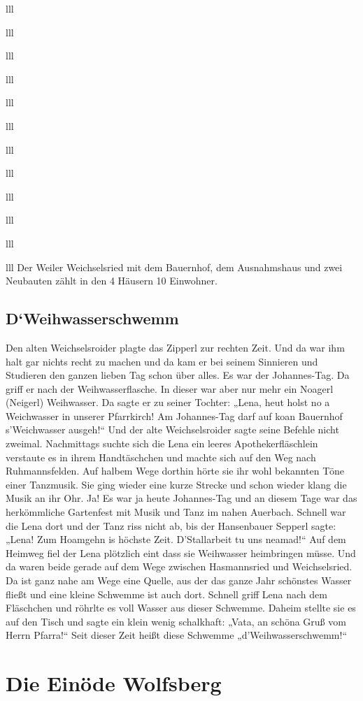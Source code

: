 \documentclass[12pt,a4pager]{book}
\begin{document}
\begin{tabuluar}{lll}
\begin{tabuluar}{lll}
\begin{tabuluar}{lll}
\begin{tabuluar}{lll}
\begin{tabuluar}{lll}
\begin{tabuluar}{lll}
\begin{tabuluar}{lll}
\begin{tabuluar}{lll}
\begin{tabuluar}{lll}
\begin{tabuluar}{lll}
\begin{tabuluar}{lll}
\begin{tabuluar}{lll}
Der Weiler Weichselsried mit dem Bauernhof, dem Ausnahmshaus und zwei Neubauten
zählt in den 4 Häusern 10 Einwohner.

\subsection{D`Weihwasserschwemm}

Den alten Weichselsroider plagte das Zipperl zur rechten Zeit. Und da war ihm
halt gar nichts recht zu machen und da kam er bei seinem Sinnieren und Studieren
den ganzen lieben Tag schon über alles. Es war der Johannes-Tag. Da griff er
nach der Weihwasserflasche. In dieser war aber nur mehr ein Noagerl (Neigerl)
Weihwasser. Da sagte er zu seiner Tochter: „Lena, heut holst no a Weichwasser in
unserer Pfarrkirch! Am Johannes-Tag darf auf koan Bauernhof s'Weichwasser
ausgeh!“ Und der alte Weichselsroider sagte seine Befehle nicht zweimal.
Nachmittags suchte sich die Lena ein leeres Apothekerfläschlein verstaute es in
ihrem Handtäschchen und machte sich auf den Weg nach Ruhmannsfelden. Auf halbem
Wege dorthin hörte sie ihr wohl bekannten Töne einer Tanzmusik. Sie ging wieder
eine kurze Strecke und schon wieder klang die Musik an ihr Ohr. Ja! Es war ja
heute Johannes-Tag und an diesem Tage war das herkömmliche Gartenfest mit Musik
und Tanz im nahen Auerbach. Schnell war die Lena dort und der Tanz riss nicht
ab, bis der Hansenbauer Sepperl sagte: „Lena! Zum Hoamgehn is höchste Zeit.
D'Stallarbeit tu uns neamad!“ Auf dem Heimweg fiel der Lena plötzlich eint dass
sie Weihwasser heimbringen müsse. Und da waren beide gerade auf dem Wege
zwischen Hasmannsried und Weichselsried. Da ist ganz nahe am Wege eine Quelle,
aus der das ganze Jahr schönstes Wasser fließt und eine kleine Schwemme ist auch
dort. Schnell griff Lena nach dem Fläschchen und röhrlte es voll Wasser aus
dieser Schwemme. Daheim stellte sie es auf den Tisch und sagte ein klein wenig
schalkhaft: „Vata, an schöna Gruß vom Herrn Pfarra!“ Seit dieser Zeit heißt
diese Schwemme „d'Weihwasserschwemm!“

\section{Die Einöde Wolfsberg}


\end{tabuluar}
\end{tabuluar}
\end{tabuluar}
\end{tabuluar}
\end{tabuluar}
\end{tabuluar}
\end{tabuluar}
\end{tabuluar}
\end{tabuluar}
\end{tabuluar}
\end{tabuluar}
\end{tabuluar}
\end{document}
